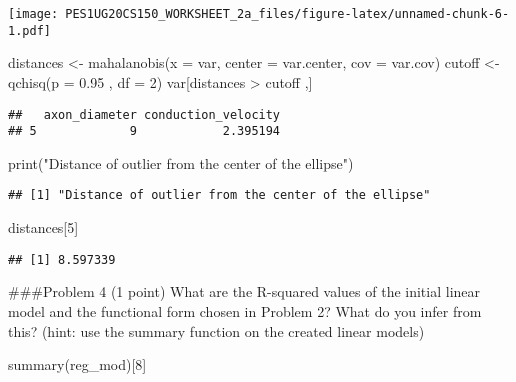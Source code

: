 \documentclass[
]{article}
\newenvironment{Shaded}{\begin{snugshade}}{\end{snugshade}}
\newcommand{\AttributeTok}[1]{\textcolor[rgb]{0.77,0.63,0.00}{#1}}
\newcommand{\DecValTok}[1]{\textcolor[rgb]{0.00,0.00,0.81}{#1}}
\newcommand{\FloatTok}[1]{\textcolor[rgb]{0.00,0.00,0.81}{#1}}
\newcommand{\FunctionTok}[1]{\textcolor[rgb]{0.00,0.00,0.00}{#1}}
\newcommand{\NormalTok}[1]{#1}
\newcommand{\OtherTok}[1]{\textcolor[rgb]{0.56,0.35,0.01}{#1}}
\newcommand{\SpecialCharTok}[1]{\textcolor[rgb]{0.00,0.00,0.00}{#1}}
\newcommand{\StringTok}[1]{\textcolor[rgb]{0.31,0.60,0.02}{#1}}
\begin{document}
\texttt{[image: PES1UG20CS150\_WORKSHEET\_2a\_files/figure-latex/unnamed-chunk-6-1.pdf]}

\begin{Shaded}
\begin{Highlighting}[]
\NormalTok{distances }\OtherTok{\textless{}{-}} \FunctionTok{mahalanobis}\NormalTok{(}\AttributeTok{x =}\NormalTok{ var, }\AttributeTok{center =}\NormalTok{ var.center, }\AttributeTok{cov =}\NormalTok{ var.cov)}
\NormalTok{cutoff }\OtherTok{\textless{}{-}} \FunctionTok{qchisq}\NormalTok{(}\AttributeTok{p =} \FloatTok{0.95}\NormalTok{ , }\AttributeTok{df =} \DecValTok{2}\NormalTok{)}
\NormalTok{var[distances }\SpecialCharTok{\textgreater{}}\NormalTok{ cutoff ,]}
\end{Highlighting}
\end{Shaded}

\begin{verbatim}
##   axon_diameter conduction_velocity
## 5             9            2.395194
\end{verbatim}

\begin{Shaded}
\begin{Highlighting}[]
\FunctionTok{print}\NormalTok{(}\StringTok{"Distance of outlier from the center of the ellipse"}\NormalTok{)}
\end{Highlighting}
\end{Shaded}

\begin{verbatim}
## [1] "Distance of outlier from the center of the ellipse"
\end{verbatim}

\begin{Shaded}
\begin{Highlighting}[]
\NormalTok{distances[}\DecValTok{5}\NormalTok{]}
\end{Highlighting}
\end{Shaded}

\begin{verbatim}
## [1] 8.597339
\end{verbatim}

\#\#\#Problem 4 (1 point) What are the R-squared values of the initial
linear model and the functional form chosen in Problem 2? What do you
infer from this? (hint: use the summary function on the created linear
models)

\begin{Shaded}
\begin{Highlighting}[]
\FunctionTok{summary}\NormalTok{(reg\_mod)[}\DecValTok{8}\NormalTok{]}
\end{Highlighting}
\end{Shaded}
\end{document}
